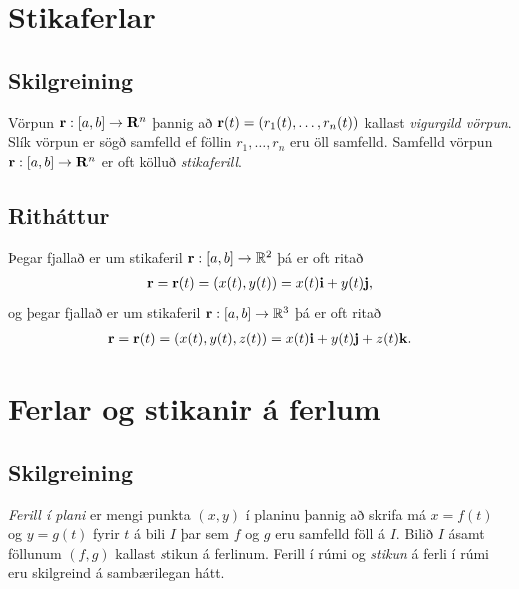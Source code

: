 \documentclass[a4paper,10pt,icelandic]{sphinxmanual}
\begin{document}
\section{Stikaferlar}
\label{Kafli1:stikaferlar}

\subsection{Skilgreining}
\label{Kafli1:skilgreining}\label{Kafli1:index-0}
Vörpun \(\mbox{${\bf r}$}:  [a,b]\rightarrow \mbox{${\bf R}^n$}\)
þannig að \(\mbox{${\bf r}$}(t)=(r_1(t),\ldots,r_n(t))\) kallast
\emph{vigurgild vörpun}. Slík vörpun er sögð samfelld ef föllin
\(r_1, \ldots, r_n\) eru öll samfelld. Samfelld vörpun
\(\mbox{${\bf r}$}:  [a,b]\rightarrow \mbox{${\bf R}^n$}\) er oft
kölluð \textit{stikaferill}.


\subsection{Ritháttur}
\label{Kafli1:rithattur}
Þegar fjallað er um stikaferil
\(\mbox{${\bf r}$}:  [a,b]\rightarrow {\mathbb  R}^2\) þá er oft
ritað
\begin{gather}
\begin{split}\displaystyle \mbox{${\bf r}$}=\mbox{${\bf r}$}(t)=(x(t),y(t))=x(t)\mbox{${\bf i}$}+y(t)\mbox{${\bf j}$},\end{split}\notag
\end{gather}
og þegar fjallað er um stikaferil
\(\mbox{${\bf r}$}:  [a,b]\rightarrow {\mathbb  R}^3\) þá er oft
ritað
\begin{gather}
\begin{split}\displaystyle \mbox{${\bf r}$}=\mbox{${\bf r}$}(t)=(x(t),y(t),z(t))=x(t)\mbox{${\bf i}$}+y(t)\mbox{${\bf j}$}+z(t)\mbox{${\bf k}$}.\end{split}\notag
\end{gather}

\section{Ferlar og stikanir á ferlum}
\label{Kafli1:ferlar-og-stikanir-a-ferlum}

\subsection{Skilgreining}
\label{Kafli1:id1}\label{Kafli1:index-1}
\textit{Ferill í plani} er mengi punkta \((x,y)\) í planinu þannig að
skrifa má \(x=f(t)\) og \(y=g(t)\) fyrir \(t\) á bili
\(I\) þar sem \(f\) og \(g\) eru samfelld föll á \(I\).
Bilið \(I\) ásamt föllunum \((f,g)\) kallast \emph{s}tikun á
ferlinum. Ferill í rúmi og \textit{stikun} á ferli í rúmi eru skilgreind á
sambærilegan hátt.
\end{document}
